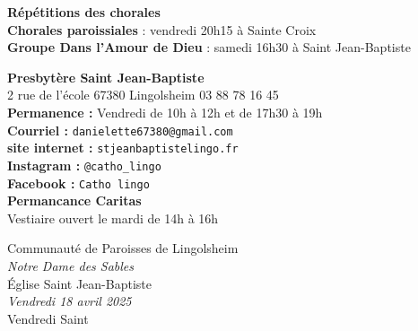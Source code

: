 \documentclass[11pt,a4paper]{article}
\newcommand{\HorRule}[1]{\noindent\rule{\linewidth}{#1}} %
\newcommand{\SepRule}{\noindent							 %
						\begin{center}
							\rule{250pt}{1pt}
						\end{center}
						}
\newcommand{\JournalName}[1]{%
		\begin{center}	
            \Large \usefont{T1}{augie}{m}{n}
			#1%
		\end{center}	
		\par \normalsize \normalfont}
\begin{document}
\textbf{Répétitions des chorales}\\
\textbf{Chorales paroissiales} : vendredi 20h15 à Sainte Croix\\
\textbf{Groupe \og Dans l’Amour de Dieu \fg} : samedi 16h30 à Saint Jean-Baptiste

\begin{multicols}{2}
\textbf{Presbytère Saint Jean-Baptiste}\\
2 rue de l'école 67380 Lingolsheim 03 88 78 16 45\\
\textbf{Permanence :} Vendredi de 10h à 12h et de 17h30 à 19h\\
\textbf{Courriel :} \texttt{danielette67380@gmail.com}\\
\textbf{site internet :} \texttt{stjeanbaptistelingo.fr}\\
\textbf{Instagram :} \texttt{@catho\_lingo}\\
\textbf{Facebook :} \texttt{Catho lingo}\\
\textbf{Permancance Caritas}\\ Vestiaire ouvert le mardi de 14h à 16h\\
\end{multicols}


%      
%    
  

\newpage

\JournalName{Communauté de Paroisses de Lingolsheim \\
\normalsize \textit{Notre Dame des Sables}
\\ \large \'{E}glise Saint Jean-Baptiste
\\  \normalsize \textit{Vendredi 18 avril 2025}
\\ \large Vendredi Saint}


\begin{minipage}[h]{1.0\linewidth}

\end{minipage}
\end{document}
